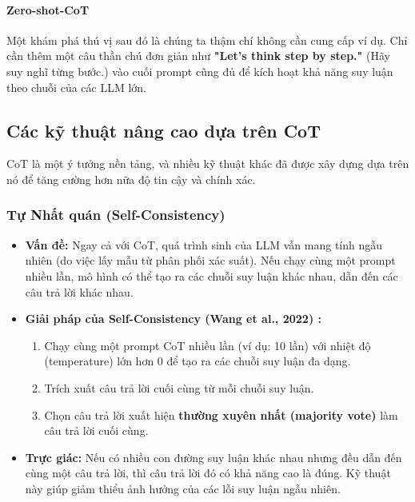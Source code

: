 \paragraph{Zero-shot-CoT}
Một khám phá thú vị sau đó là chúng ta thậm chí không cần cung cấp ví dụ. Chỉ cần thêm một câu thần chú đơn giản như \textbf{"Let's think step by step."} (Hãy suy nghĩ từng bước.) vào cuối prompt cũng đủ để kích hoạt khả năng suy luận theo chuỗi của các LLM lớn.

\subsection{Các kỹ thuật nâng cao dựa trên CoT}
\label{ssec:advanced_cot}
CoT là một ý tưởng nền tảng, và nhiều kỹ thuật khác đã được xây dựng dựa trên nó để tăng cường hơn nữa độ tin cậy và chính xác.

\subsubsection{Tự Nhất quán (Self-Consistency)}
\begin{itemize}
    \item \textbf{Vấn đề:} Ngay cả với CoT, quá trình sinh của LLM vẫn mang tính ngẫu nhiên (do việc lấy mẫu từ phân phối xác suất). Nếu chạy cùng một prompt nhiều lần, mô hình có thể tạo ra các chuỗi suy luận khác nhau, dẫn đến các câu trả lời khác nhau.
    \item \textbf{Giải pháp của Self-Consistency (Wang et al., 2022) \cite{wang2022self}:}
        \begin{enumerate}
            \item Chạy cùng một prompt CoT nhiều lần (ví dụ: 10 lần) với nhiệt độ (temperature) lớn hơn 0 để tạo ra các chuỗi suy luận đa dạng.
            \item Trích xuất câu trả lời cuối cùng từ mỗi chuỗi suy luận.
            \item Chọn câu trả lời xuất hiện \textbf{thường xuyên nhất (majority vote)} làm câu trả lời cuối cùng.
        \end{enumerate}
    \item \textbf{Trực giác:} Nếu có nhiều con đường suy luận khác nhau nhưng đều dẫn đến cùng một câu trả lời, thì câu trả lời đó có khả năng cao là đúng. Kỹ thuật này giúp giảm thiểu ảnh hưởng của các lỗi suy luận ngẫu nhiên.
\end{itemize}

